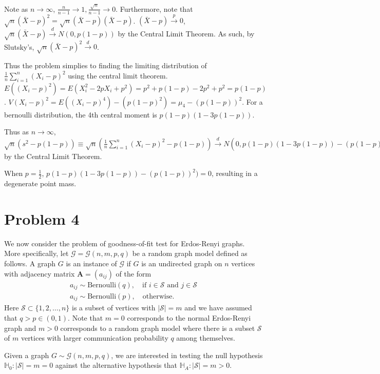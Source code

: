 \documentclass[
]{article}
\begin{document}
Note as \(n\to\infty\),
\(\frac{n}{n-1} \to 1, \frac{\sqrt{n}}{n-1}\to 0\). Furthermore, note
that \(\sqrt{n}(\bar{X}-p)^2 = \sqrt{n}(\bar{X}-p)(\bar{X}-p)\).
\((\bar{X}-p) \overset{p}{\to} 0\),
\(\sqrt{n}(\bar{X}-p) \overset{d}{\to} N(0,p(1-p))\) by the Central
Limit Theorem. As such, by Slutsky's,
\(\sqrt{n}(\bar{X}-p)^2 \overset{d}{\to} 0\).

Thus the problem simplies to finding the limiting distribution of
\(\frac{1}{n}\displaystyle\sum_{i=1}^n(X_i-p)^2\) using the central
limit theorem.
\(E((X_i-p)^2) = E(X_i^2 - 2pX_i + p^2) = p^2 + p(1-p)-2p^2 +p^2 = p(1-p)\).
\(V(X_i-p)^2 = E((X_i-p)^4) - (p(1-p)^2) = \mu_4 - (p(1-p))^2\). For a
bernoulli distribution, the 4th central moment is \(p(1-p)(1-3p(1-p))\).

Thus as \(n \to \infty\),
\(\sqrt{n}(s^2 - p(1-p)) \equiv \sqrt{n}(\frac{1}{n}\sum_{i=1}^n(X_i-p)^2-p(1-p)) \overset{d}{\to}N(0,p(1-p)(1-3p(1-p))-(p(1-p))^2)\)
by the Central Limit Theorem.

When \(p = \frac{1}{2}\), \(p(1-p)(1-3p(1-p))-(p(1-p))^2) = 0\),
resulting in a degenerate point mass.

\hypertarget{problem-4}{%
\section{Problem 4}\label{problem-4}}

We now consider the problem of goodness-of-fit test for Erdos-Renyi
graphs. More specifically, let \(\mathcal{G} = \mathcal{G}(n,m,p, q)\)
be a random graph model defined as follows. A graph \(G\) is an instance
of \(\mathcal{G}\) if \(G\) is an undirected graph on \(n\) vertices
with adjacency matrix \(\mathbf{A} = (a_{ij})\) of the form
\begin{gather*}
a_{ij} \sim \mathrm{Bernoulli}(q), \quad \text{if $i \in \mathcal{S}$ and $j \in \mathcal{S}$} \\
a_{ij} \sim \mathrm{Bernoulli}(p), \quad \text{otherwise}.
\end{gather*} Here \(\mathcal{S} \subset \{1,2,\dots,n\}\) is a subset
of vertices with \(|\mathcal{S}| = m\) and we have assumed that
\(q > p \in (0,1)\). Note that \(m = 0\) corresponds to the normal
Erdos-Renyi graph and \(m > 0\) corresponds to a random graph model
where there is a subset \(\mathcal{S}\) of \(m\) vertices with larger
communication probability \(q\) among themselves.

Given a graph \(G \sim \mathcal{G}(n,m,p,q)\), we are interested in
testing the null hypothesis
\(\mathbb{H}_0 \colon |\mathcal{S}| = m = 0\) against the alternative
hypothesis that \(\mathbb{H}_A \colon |\mathcal{S}| = m > 0\).
\end{document}
